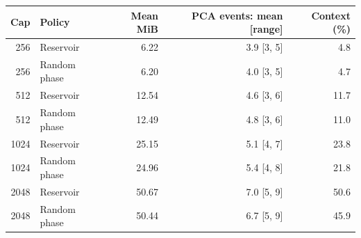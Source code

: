 \begin{tabular}{rlrrr}
\toprule
Cap & Policy & Mean MiB & PCA events: mean [range] & Context (\%) \\
\midrule
256 & Reservoir & 6.22 & 3.9 [3, 5] & 4.8 \\
256 & Random phase & 6.20 & 4.0 [3, 5] & 4.7 \\
512 & Reservoir & 12.54 & 4.6 [3, 6] & 11.7 \\
512 & Random phase & 12.49 & 4.8 [3, 6] & 11.0 \\
1024 & Reservoir & 25.15 & 5.1 [4, 7] & 23.8 \\
1024 & Random phase & 24.96 & 5.4 [4, 8] & 21.8 \\
2048 & Reservoir & 50.67 & 7.0 [5, 9] & 50.6 \\
2048 & Random phase & 50.44 & 6.7 [5, 9] & 45.9 \\
\bottomrule
\end{tabular}
